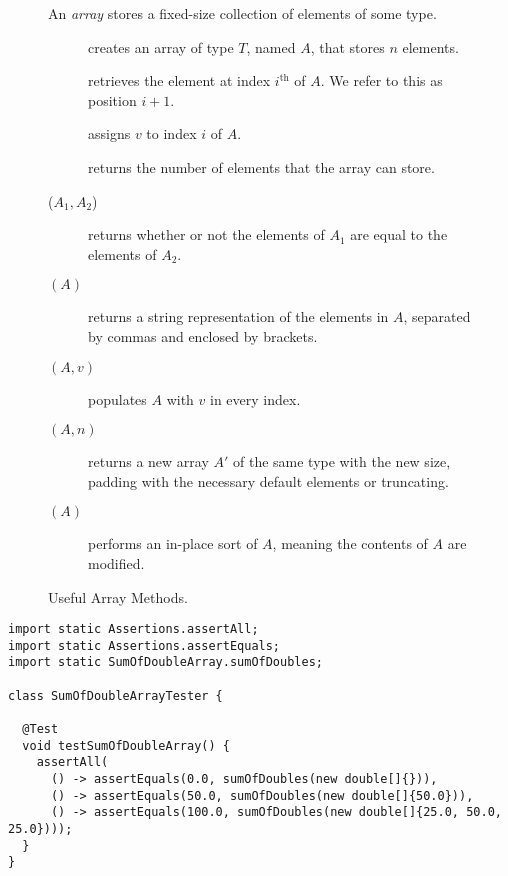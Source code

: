 \begin{figure}[tp]
  \small
  \begin{tcolorbox}[title=Java Arrays]
    An \emph{array} stores a fixed-size collection of elements of some type.
    \vspace{2ex}
  \begin{description}
    \item [] creates an array of type $T$, named $A$, that stores $n$ elements.
    \item [] retrieves the element at index $i^{\text{th}}$ of $A$. We refer to this as position $i + 1$.
    \item [] assigns $v$ to index $i$ of $A$.
    \item [] returns the number of elements that the array can store.
    \item [($A_1, A_2$)] returns whether or not the elements of $A_1$ are equal to the elements of $A_2$.
    \item [$(A)$] returns a string representation of the elements in $A$, separated by commas and enclosed by brackets.
    \item [$(A, v)$] populates $A$ with $v$ in every index.
    \item [$(A, n)$] returns a new array $A'$ of the same type with the new size, padding with the necessary default elements or truncating.
    \item [$(A)$] performs an in-place sort of $A$, meaning the contents of $A$ are modified.
  \end{description}
\end{tcolorbox}
  \caption{Useful Array Methods.}
  \label{fig:arrays}
\end{figure}


\begin{lstlisting}[language=MyJava]
import static Assertions.assertAll;
import static Assertions.assertEquals;
import static SumOfDoubleArray.sumOfDoubles;

class SumOfDoubleArrayTester {

  @Test
  void testSumOfDoubleArray() {
    assertAll(
      () -> assertEquals(0.0, sumOfDoubles(new double[]{})),
      () -> assertEquals(50.0, sumOfDoubles(new double[]{50.0})),
      () -> assertEquals(100.0, sumOfDoubles(new double[]{25.0, 50.0, 25.0})));
  }
}
\end{lstlisting}

